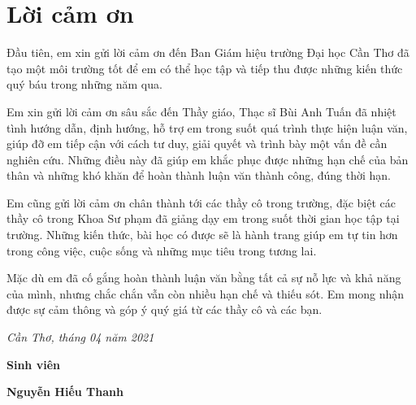 \chapter*{Lời cảm ơn}

Đầu tiên, em xin gửi lời cảm ơn đến Ban Giám hiệu trường Đại học Cần Thơ đã tạo một môi trường tốt để em có thể học tập và tiếp thu được những kiến thức quý báu trong những năm qua.\par
Em xin gửi lời cảm ơn sâu sắc đến Thầy giáo, Thạc sĩ Bùi Anh Tuấn đã nhiệt tình hướng dẫn, định hướng, hỗ trợ em trong suốt quá trình thực hiện luận văn, giúp đỡ em tiếp cận với cách tư duy, giải quyết và trình bày một vấn đề cần nghiên cứu. Những điều này đã giúp em khắc phục được những hạn chế của bản thân và những khó khăn để hoàn thành luận văn thành công, đúng thời hạn.\par
Em cũng gửi lời cảm ơn chân thành tới các thầy cô trong trường, đặc biệt các thầy cô trong Khoa Sư phạm đã giảng dạy em trong suốt thời gian học tập tại trường. Những kiến thức, bài học có được sẽ là hành trang giúp em tự tin hơn trong công việc, cuộc sống và những mục tiêu trong tương lai.\par
Mặc dù em đã cố gắng hoàn thành luận văn bằng tất cả sự nỗ lực và khả năng của mình, nhưng chắc chắn vẫn còn nhiều hạn chế và thiếu sót. Em mong nhận được sự cảm thông và góp ý quý giá từ các thầy cô và các bạn.\par

\begin{adjustwidth}{8cm}{0cm}
	\centering
	\textit{Cần Thơ, tháng 04 năm 2021}\par
	\textbf{Sinh viên}\par
	\vspace{3cm}
	\textbf{Nguyễn Hiếu Thanh}\par
\end{adjustwidth}\par
